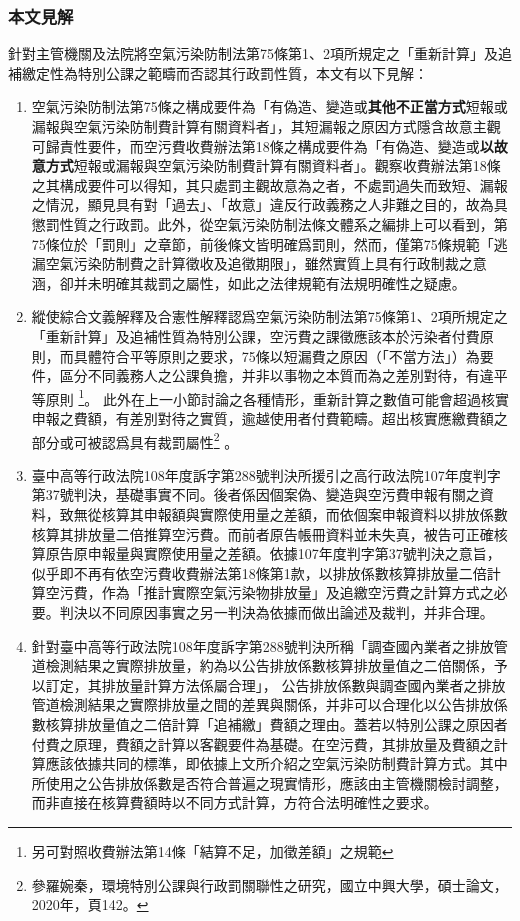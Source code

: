 \subsubsection{本文見解}
針對主管機關及法院將空氣污染防制法第75條第1、2項所規定之「重新計算」及追補繳定性為特別公課之範疇而否認其行政罰性質，本文有以下見解：
\begin{enumerate}
   \item 空氣污染防制法第75條之構成要件為「有偽造、變造或\textbf{其他不正當方式}短報或漏報與空氣污染防制費計算有關資料者」，其短漏報之原因方式隱含故意主觀可歸責性要件，而空污費收費辦法第18條之構成要件為「有偽造、變造或\textbf{以故意方式}短報或漏報與空氣污染防制費計算有關資料者」。觀察收費辦法第18條之其構成要件可以得知，其只處罰主觀故意為之者，不處罰過失而致短、漏報之情況，顯見具有對「過去」、「故意」違反行政義務之人非難之目的，故為具懲罰性質之行政罰。此外，從空氣污染防制法條文體系之編排上可以看到，第75條位於「罰則」之章節，前後條文皆明確爲罰則，然而，僅第75條規範「逃漏空氣污染防制費之計算徵收及追徵期限」，雖然實質上具有行政制裁之意涵，卻并未明確其裁罰之屬性，如此之法律規範有法規明確性之疑慮。
   \item 縱使綜合文義解釋及合憲性解釋認爲空氣污染防制法第75條第1、2項所規定之「重新計算」及追補性質為特別公課，空污費之課徵應該本於污染者付費原則，而具體符合平等原則之要求，75條以短漏費之原因（「不當方法」）為要件，區分不同義務人之公課負擔，并非以事物之本質而為之差別對待，有違平等原則
   \footnote{另可對照收費辦法第14條「結算不足，加徵差額」之規範}。
   此外在上一小節討論之各種情形，重新計算之數值可能會超過核實申報之費額，有差別對待之實質，逾越使用者付費範疇。超出核實應繳費額之部分或可被認爲具有裁罰屬性\footnote{參羅婉秦，環境特別公課與行政罰關聯性之研究，國立中興大學，碩士論文，2020年，頁142。}
   。
   \item 臺中高等行政法院108年度訴字第288號判決所援引之高行政法院107年度判字第37號判決，基礎事實不同。後者係因個案偽、變造與空污費申報有關之資料，致無從核算其申報額與實際使用量之差額，而依個案申報資料以排放係數核算其排放量二倍推算空污費。而前者原告帳冊資料並未失真，被告可正確核算原告原申報量與實際使用量之差額。依據107年度判字第37號判決之意旨，似乎即不再有依空污費收費辦法第18條第1款，以排放係數核算排放量二倍計算空污費，作為「推計實際空氣污染物排放量」及追繳空污費之計算方式之必要。判決以不同原因事實之另一判決為依據而做出論述及裁判，并非合理。
   \item 針對臺中高等行政法院108年度訴字第288號判決所稱「調查國內業者之排放管道檢測結果之實際排放量，約為以公告排放係數核算排放量值之二倍關係，予以訂定，其排放量計算方法係屬合理」，
   公告排放係數與調查國內業者之排放管道檢測結果之實際排放量之間的差異與關係，并非可以合理化以公告排放係數核算排放量值之二倍計算「追補繳」費額之理由。蓋若以特別公課之原因者付費之原理，費額之計算以客觀要件為基礎。在空污費，其排放量及費額之計算應該依據共同的標準，即依據上文所介紹之空氣污染防制費計算方式。其中所使用之公告排放係數是否符合普遍之現實情形，應該由主管機關檢討調整，而非直接在核算費額時以不同方式計算，方符合法明確性之要求。
\end{enumerate}

